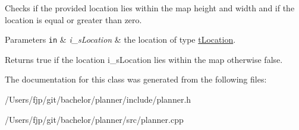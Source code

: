 Checks if the provided location lies within the map height and width and if the location is equal or greater than zero. 
\begin{DoxyParams}[1]{Parameters}
\mbox{\tt in}  & {\em i\+\_\+s\+Location} & the location of type \mbox{\hyperlink{structplanner_1_1t_location}{t\+Location}}. \\
\hline
\end{DoxyParams}
\begin{DoxyReturn}{Returns}
true if the location i\+\_\+s\+Location lies within the map otherwise false. 
\end{DoxyReturn}


The documentation for this class was generated from the following files\+:\begin{DoxyCompactItemize}
\item 
/\+Users/fjp/git/bachelor/planner/include/planner.\+h\item 
/\+Users/fjp/git/bachelor/planner/src/planner.\+cpp\end{DoxyCompactItemize}
